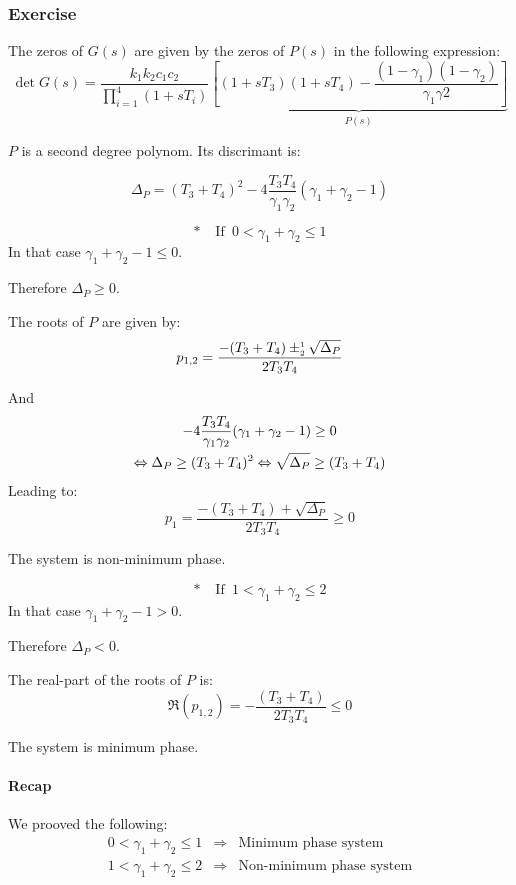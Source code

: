 \subsubsection{Exercise}

The zeros of $G(s)$ are given by the zeros of $P(s)$ in the following expression:
$$
\det G(s) = \frac{k_1k_2c_1c_2}{\prod_{i=1}^{4} (1 + s T_i)}
\underbrace{\left[ (1+sT_3)(1+sT_4) - \frac{(1-\gamma_1)(1 - \gamma_2)}{\gamma_1\gamma2}\right]}_{P(s)}
$$

$P$ is a second degree polynom. Its discrimant is:

$$
\Delta_P = (T_3+T_4)^2 - 4\frac{T_3T_4}{\gamma_1\gamma_2}(\gamma_1+\gamma_2-1) 
$$

    $$\ast \phantom{aa} \text{If} \phantom{a} 0 < \gamma_1 + \gamma_2 \leq 1$$
In that case $\gamma_1 + \gamma_2 - 1 \leq 0$. 

Therefore
$\Delta_P \geq 0$.

The roots of $P$ are given by:
$$
p_{1,2} = \frac{-(T_3+T_4) \pm_\text{\tiny{2}}^\text{\tiny{1}} \sqrt{\Delta_P}}{2T_3T_4}
$$

And 
\begin{multline*}
    -4\frac{T_3T_4}{\gamma_1\gamma_2}(\gamma_1+\gamma_2-1) \geq 0 \\ \Leftrightarrow \Delta_P \geq (T_3+T_4)^2 \Leftrightarrow \sqrt{\Delta_P}\geq (T_3+T_4)$$
\end{multline*}
Leading to:
$$
p_1 = \frac{-(T_3+T_4) + \sqrt{\Delta_P}}{2T_3T_4} \geq 0
$$

The system is non-minimum phase.


    $$\ast \phantom{aa} \text{If} \phantom{a} 1 < \gamma_1 + \gamma_2 \leq 2$$
In that case $\gamma_1+\gamma_2 -1 > 0$.

Therefore
$\Delta_P < 0$.

The real-part of the roots of $P$ is:
$$
\Re(p_{1,2}) = -\frac{(T_3+T_4)}{2T_3T_4} \leq 0
$$

The system is minimum phase.

\paragraph{Recap}

We prooved the following:
$$
\begin{array}{rcl}
    0 < \gamma_1 + \gamma_2 \leq 1 & \Rightarrow & \text{Minimum phase system} \\
    1 < \gamma_1 + \gamma_2 \leq 2 & \Rightarrow & \text{Non-minimum phase system} \\
\end{array}
$$
